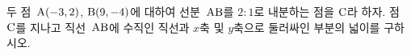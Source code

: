 두 점~$\mathrm{A}(-3{,}\mkern3mu\mathopen{}2)$, $\mathrm{B}(9{,}\mkern3mu\mathopen{}-4)$에 대하여 선분~$\mathrm{AB}$를 $2:1$로 내분하는 점을 $\mathrm{C}$라 하자. 점~$\mathrm{C}$를 지나고 직선~$\mathrm{AB}$에 수직인 직선과 $x$축 및 $y$축으로 둘러싸인 부분의 넓이를 구하시오.
